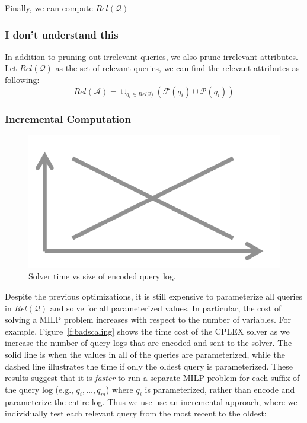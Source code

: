 Finally, we can compute $Rel\mathcal{(Q)}$



\subsubsection{I don't understand this}


In addition to pruning out irrelevant queries,
we also prune irrelevant attributes. \\
Let $Rel\mathcal{(Q)}$ as the set of 
relevant queries, we can find the relevant 
attributes as following:
\[Rel\mathcal{(A)} = \cup_{q_i \in Rel\mathcal{Q)}} 
(\mathcal{F}(q_i)\cup \mathcal{P}(q_i)) \]



\subsubsection{Incremental Computation}

\begin{figure}[t]
  \centering
  \includegraphics[width=.4\textwidth]{figures/placeholder}
  \caption{Solver time vs size of encoded query log.}
  \label{fig:badscaling}
\end{figure}


Despite the previous optimizations, it is still expensive to parameterize all 
queries in $Rel\mathcal{(Q)}$ and solve for all parameterized values.
In particular, the cost of solving a MILP problem increases 
with respect to the number of variables.
For example, Figure~\ref{f:badscaling} shows the time cost of the CPLEX solver
as we increase the number of query logs that are encoded and sent to the solver.  
The solid line is when the values in all of the queries are parameterized, while
the dashed line illustrates the time if only the oldest query is parameterized. 
These results suggest that it is {\it faster} to run a separate MILP problem for each 
suffix of the query log (e.g., $q_i, \ldots, q_m$) where $q_i$ is parameterized, 
rather than encode and parameterize the entire log.
Thus we use use an incremental approach, where we individually test each relevant query from the most recent
to the oldest:


